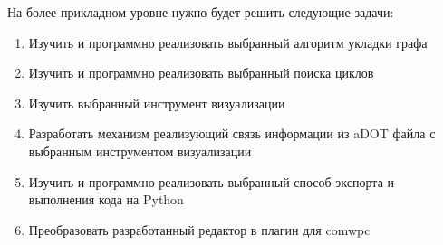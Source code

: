 На более прикладном уровне нужно будет решить следующие задачи:
\begin{enumerate}
\item Изучить и программно реализовать выбранный алгоритм укладки графа
\item Изучить и программно реализовать выбранный поиска циклов
\item Изучить выбранный инструмент визуализации 
\item Разработать механизм реализующий связь информации из aDOT файла с выбранным инструментом визуализации
\item Изучить и программно реализовать выбранный способ экспорта и выполнения кода на Python
\item Преобразовать разработанный редактор в плагин для comwpc
\end{enumerate}

\noteattributes{}